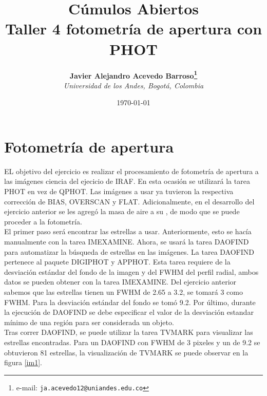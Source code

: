 \documentclass[12pt]{article}
\begin{document}
\title{Cúmulos Abiertos \\ Taller 4 fotometría de apertura con PHOT}

\author{
\textbf{Javier Alejandro Acevedo Barroso\thanks{e-mail: \texttt{ja.acevedo12@uniandes.edu.co}}}\\
\textit{Universidad de los Andes, Bogotá, Colombia}\\
 }%

\date{\today}
\maketitle %


\normalsize
\newpage



\section{Fotometría de apertura}
EL objetivo del ejercicio es realizar el procesamiento de fotometría de apertura a las imágenes ciencia del ejecicio  de IRAF. En esta ocasión se utilizará la tarea PHOT en vez de QPHOT.
Las imágenes a usar ya tuvieron la respectiva corrección de BIAS, OVERSCAN y FLAT. Adicionalmente, en el desarrollo del ejercicio anterior se les agregó la masa de aire a su , de modo que se puede proceder a la fotometría.\\

El primer paso será encontrar las estrellas a usar. Anteriormente, esto se hacía manualmente con la tarea IMEXAMINE. 
Ahora, se usará la tarea DAOFIND para automatizar la búsqueda de estrellas en las imágenes. 
La tarea DAOFIND pertenece al paquete DIGIPHOT y APPHOT. 
Esta tarea requiere de la desviación estándar del {fondo} de la imagen y del FWHM del perfil radial, ambos datos se pueden obtener con la tarea IMEXAMINE.
Del ejercicio anterior sabemos que las estrellas tienen un FWHM de 2.65 a 3.2, se tomará 3 como FWHM. Para la desviación estándar del fondo se tomó 9.2.
Por último, durante la ejecución de DAOFIND se debe especificar el valor de la desviación estandar mínimo de una región para ser considerada un objeto.    	\\

Tras correr DAOFIND, se puede utilizar la tarea TVMARK para visualizar las estrellas encontradas.
Para un DAOFIND con FWHM de 3 pixeles y un  de 9.2 se obtuvieron 81 estrellas, la visualización de TVMARK se puede observar en la figura \ref{im1}.\\
\end{document}
